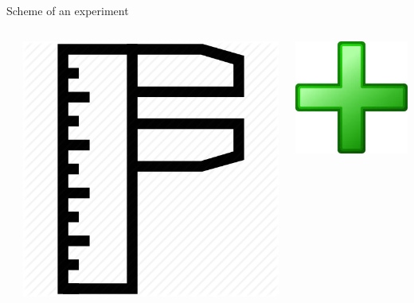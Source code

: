 \documentclass[8pt,pdf,hyperref={unicode}]{beamer}
\begin{document}
\begin{frame}
\begin{block}{Scheme of an experiment}
\begin{columns}
\begin{column}{0.05\textwidth}
        \end{column}
        \begin{column}{0.15\textwidth}
            \includegraphics[width=1\textwidth]{image/pribor.png}\\
        \end{column}
        \begin{column}{0.05\textwidth} 
            \includegraphics[width=1\textwidth]{image/plus.jpeg}

\end{column}
\end{columns}
\end{block}
\end{frame}
\end{document}
